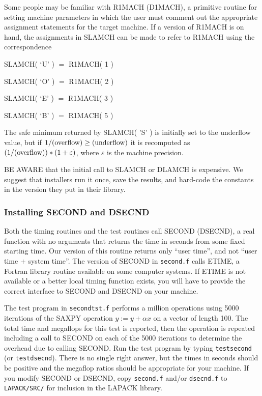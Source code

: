 Some people may be familiar with R1MACH (D1MACH), a primitive
routine for setting machine parameters in which the user must
comment out the appropriate assignment statements for the target
machine.  If a version of R1MACH is on hand, the assignments in
SLAMCH can be made to refer to R1MACH using the correspondence

\begin{list}{}{}
\item {SLAMCH( `U' )}  $=$ R1MACH( 1 )
\item {SLAMCH( `O' )}  $=$ R1MACH( 2 )
\item {SLAMCH( `E' )}  $=$ R1MACH( 3 )
\item {SLAMCH( `B' )}  $=$ R1MACH( 5 )
\end{list}

\noindent
The safe minimum returned by SLAMCH( 'S' ) is initially set to the
underflow value, but if $1/({\rm overflow}) \geq ({\rm underflow})$
it is recomputed as $(1/({\rm overflow})) * ( 1 + \varepsilon )$,
where $\varepsilon$ is the machine precision.

BE AWARE that the initial call to SLAMCH or DLAMCH is expensive.  
We suggest that installers run it once, save the results, and hard-code
the constants in the version they put in their library.

\subsubsection{Installing SECOND and DSECND}
\dent
Both the timing routines and the test routines call SECOND
(DSECND), a real function with no arguments that returns the time
in seconds from some fixed starting time.
Our version of this routine returns only ``user time'', and
not ``user time $+$ system time''. 
The version of SECOND in {\tt second.f} calls ETIME, a Fortran library
routine available on some computer systems.
If ETIME is not available or a better local timing function exists,
you will have to provide the correct interface to SECOND and DSECND
on your machine.

The test program in {\tt secondtst.f}
performs a million operations using 5000 iterations of 
the SAXPY operation $y := y + \alpha x$ on a vector of length 100.
The total time and megaflops for this test is reported, then
the operation is repeated including a call to SECOND on each of
the 5000 iterations to determine the overhead due to calling SECOND.
Run the test program by typing {\tt testsecond} (or {\tt testdsecnd}).
There is no single right answer, but the times
in seconds should be positive and the megaflop ratios should be 
appropriate for your machine.
If you modify SECOND or DSECND, copy {\tt second.f} and/or {\tt dsecnd.f} to
{\tt LAPACK/SRC/} for inclusion in the LAPACK library.

